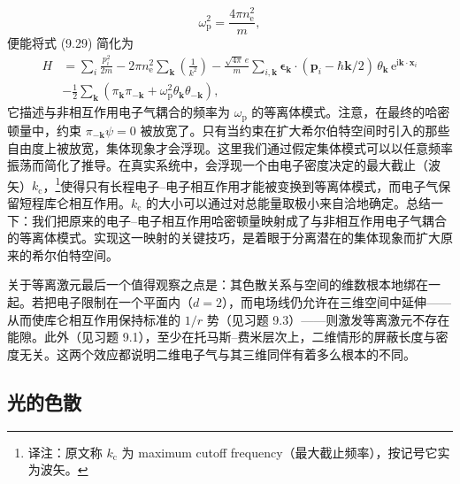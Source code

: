 \begin{equation*}
\omega_{\mathrm{p}}^2=\frac{4\pi n_{\mathrm{e}}^2}{m},\tag{9.36}
\end{equation*}
便能将式 (9.29) 简化为
\begin{equation*}
\begin{aligned}
H&=\sum_i\frac{p_i^2}{2m}-2\pi n_{\mathrm{e}}^2\sum_{\mathbf{k}}\left(\frac{1}{k^2}\right)-\frac{\sqrt{4\pi}\,e}{m}\sum_{i,\mathbf{k}}\boldsymbol{\epsilon}_{\mathbf{k}}\cdot(\mathbf{p}_i-\hbar\mathbf{k}/2)\,\theta_{\mathbf{k}}\,\mathrm{e}^{\mathrm{i}\mathbf{k}\cdot\mathbf{x}_i}\\
&-\frac{1}{2}\sum_{\mathbf{k}}\left(\pi_{\mathbf{k}}\pi_{-\mathbf{k}}+\omega_{\mathrm{p}}^2\theta_{\mathbf{k}}\theta_{-\mathbf{k}}\right),
\end{aligned}\tag{9.37}
\end{equation*}
它描述与非相互作用电子气耦合的频率为 $\omega_{\mathrm{p}}$ 的等离体模式。注意，在最终的哈密顿量中，约束 $\pi_{-\mathbf{k}}\psi=0$ 被放宽了。只有当约束在扩大希尔伯特空间时引入的那些自由度上被放宽，集体现象才会浮现。这里我们通过假定集体模式可以以任意频率振荡而简化了推导。在真实系统中，会浮现一个由电子密度决定的最大截止（波矢）$k_{\mathrm{c}}$，\footnote{译注：原文称 $k_{\mathrm{c}}$ 为 maximum cutoff frequency（最大截止频率），按记号它实为波矢。}使得只有长程电子–电子相互作用才能被变换到等离体模式，而电子气保留短程库仑相互作用。$k_{\mathrm{c}}$ 的大小可以通过对总能量取极小来自洽地确定。总结一下：我们把原来的电子–电子相互作用哈密顿量映射成了与非相互作用电子气耦合的等离体模式。实现这一映射的关键技巧，是着眼于分离潜在的集体现象而扩大原来的希尔伯特空间。

关于等离激元最后一个值得观察之点是：其色散关系与空间的维数根本地绑在一起。若把电子限制在一个平面内（$d=2$），而电场线仍允许在三维空间中延伸——从而使库仑相互作用保持标准的 $1/r$ 势（见习题 9.3）——则激发等离激元不存在能隙。此外（见习题 9.1），至少在托马斯–费米层次上，二维情形的屏蔽长度与密度无关。这两个效应都说明二维电子气与其三维同伴有着多么根本的不同。

\subsection{光的色散}

